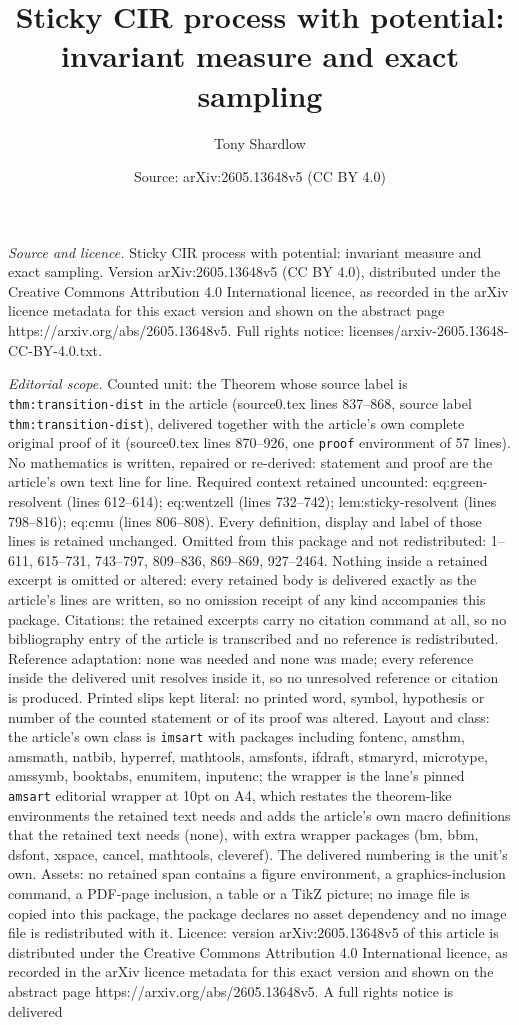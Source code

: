 \documentclass[10pt,a4paper]{amsart}
\title[Sticky CIR process with potential: invariant measure and exa]{Sticky CIR process with potential: invariant measure and exact sampling}
\author{Tony Shardlow}
\date{Source: arXiv:2605.13648v5 (CC BY 4.0)}
\begin{document}
\maketitle

\noindent\emph{Source and licence.} Sticky CIR process with potential: invariant measure and exact sampling. Version arXiv:2605.13648v5 (CC BY 4.0), distributed under the Creative Commons Attribution 4.0 International licence, as recorded in the arXiv licence metadata for this exact version and shown on the abstract page https://arxiv.org/abs/2605.13648v5. Full rights notice: licenses/arxiv-2605.13648-CC-BY-4.0.txt.\par\smallskip

\noindent\textit{Editorial scope.} Counted unit: the Theorem whose source label is \texttt{thm:transition-dist} in the article (source0.tex lines 837--868, source label \texttt{thm:transition-dist}), delivered together with the article's own complete original proof of it (source0.tex lines 870--926, one \texttt{proof} environment of 57 lines). No mathematics is written, repaired or re-derived: statement and proof are the article's own text line for line. Required context retained uncounted: eq:green-resolvent (lines 612--614); eq:wentzell (lines 732--742); lem:sticky-resolvent (lines 798--816); eq:cmu (lines 806--808). Every definition, display and label of those lines is retained unchanged. Omitted from this package and not redistributed: 1--611, 615--731, 743--797, 809--836, 869--869, 927--2464. Nothing inside a retained excerpt is omitted or altered: every retained body is delivered exactly as the article's lines are written, so no omission receipt of any kind accompanies this package. Citations: the retained excerpts carry no citation command at all, so no bibliography entry of the article is transcribed and no reference is redistributed. Reference adaptation: none was needed and none was made; every reference inside the delivered unit resolves inside it, so no unresolved reference or citation is produced. Printed slips kept literal: no printed word, symbol, hypothesis or number of the counted statement or of its proof was altered. Layout and class: the article's own class is \texttt{imsart} with packages including fontenc, amsthm, amsmath, natbib, hyperref, mathtools, amsfonts, ifdraft, stmaryrd, microtype, amssymb, booktabs, enumitem, inputenc; the wrapper is the lane's pinned \texttt{amsart} editorial wrapper at 10pt on A4, which restates the theorem-like environments the retained text needs and adds the article's own macro definitions that the retained text needs (none), with extra wrapper packages (bm, bbm, dsfont, xspace, cancel, mathtools, cleveref). The delivered numbering is the unit's own. Assets: no retained span contains a figure environment, a graphics-inclusion command, a PDF-page inclusion, a table or a TikZ picture; no image file is copied into this package, the package declares no asset dependency and no image file is redistributed with it. Licence: version arXiv:2605.13648v5 of this article is distributed under the Creative Commons Attribution 4.0 International licence, as recorded in the arXiv licence metadata for this exact version and shown on the abstract page https://arxiv.org/abs/2605.13648v5. A full rights notice is delivered 
\end{document}
